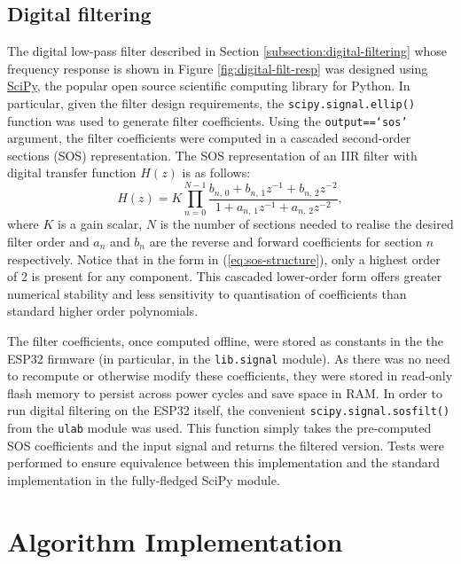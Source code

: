 \subsection{Digital filtering}
The digital low-pass filter described in Section \ref{subsection:digital-filtering} whose frequency response is shown in Figure \ref{fig:digital-filt-resp} was designed using \href{https://docs.scipy.org/doc/scipy/index.html}{SciPy}, the popular open source scientific computing library for Python. In particular, given the filter design requirements, the \texttt{scipy.signal.ellip()} function was used to generate filter coefficients. Using the \texttt{output==`sos'} argument, the filter coefficients were computed in a cascaded second-order sections (SOS) representation. The SOS representation of an IIR filter with digital transfer function $H(z)$ is as follows:
\begin{equation}
H(z)=K\prod_{n=0}^{N-1} \frac{b_{n,\, 0}+b_{n,\, 1} z^{-1}+b_{n,\, 2} z^{-2}}{1+a_{n,\, 1} z^{-1}+a_{n,\, 2}z^{-2}},
\label{eq:sos-structure}
\end{equation}
where $K$ is a gain scalar, $N$ is the number of sections needed to realise the desired filter order and $a_n$ and $b_n$ are the reverse and forward coefficients for section $n$ respectively. Notice that in the form in (\ref{eq:sos-structure}), only a highest order of 2 is present for any component. This cascaded lower-order form offers greater numerical stability and less sensitivity to quantisation of coefficients than standard higher order polynomials.

The filter coefficients, once computed offline, were stored as constants in the the ESP32 firmware (in particular, in the \texttt{lib.signal} module). As there was no need to recompute or otherwise modify these coefficients, they were stored in read-only flash memory to persist across power cycles and save space in RAM. In order to run digital filtering on the ESP32 itself, the convenient \texttt{scipy.signal.sosfilt()} from the \texttt{ulab} module was used. This function simply takes the pre-computed SOS coefficients and the input signal and returns the filtered version. Tests were performed to ensure equivalence between this implementation and the standard implementation in the fully-fledged SciPy module.  

\section{Algorithm Implementation}
